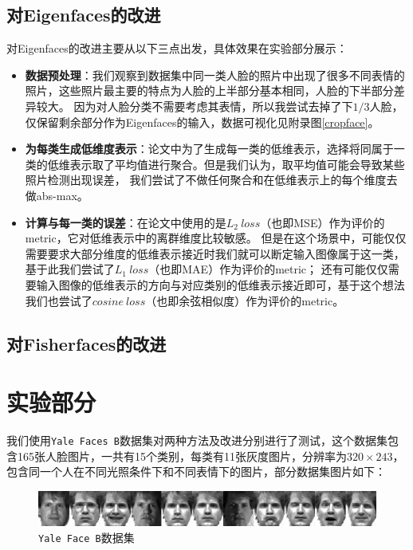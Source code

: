 \documentclass{ctexart}
\begin{document}
    \subsection{对Eigenfaces的改进}
    \noindent
    对Eigenfaces的改进主要从以下三点出发，具体效果在实验部分展示：
    \begin{itemize}
        \item \textbf{数据预处理}：我们观察到数据集中同一类人脸的照片中出现了很多不同表情的照片，这些照片最主要的特点为人脸的上半部分基本相同，人脸的下半部分差异较大。
                因为对人脸分类不需要考虑其表情，所以我尝试去掉了下$1/3$人脸，仅保留剩余部分作为Eigenfaces的输入，数据可视化见附录图\ref{cropface}。
        \item \textbf{为每类生成低维度表示}：论文中为了生成每一类的低维表示，选择将同属于一类的低维表示取了平均值进行聚合。但是我们认为，取平均值可能会导致某些照片检测出现误差，
                我们尝试了不做任何聚合和在低维表示上的每个维度去做abs-max。
        \item \textbf{计算与每一类的误差}：在论文中使用的是$L_2\ loss$（也即MSE）作为评价的metric，它对低维表示中的离群维度比较敏感。
                但是在这个场景中，可能仅仅需要要求大部分维度的低维表示接近时我们就可以断定输入图像属于这一类，基于此我们尝试了$L_1\ loss$（也即MAE）作为评价的metric；
                还有可能仅仅需要输入图像的低维表示的方向与对应类别的低维表示接近即可，基于这个想法我们也尝试了$cosine\ loss$（也即余弦相似度）作为评价的metric。
    \end{itemize}

    \subsection{对Fisherfaces的改进}


    \section{实验部分}
    我们使用\texttt{Yale Faces B}\cite{GeBeKr01}数据集对两种方法及改进分别进行了测试，这个数据集包含165张人脸图片，一共有15个类别，每类有11张灰度图片，分辨率为$320\times 243$，包含同一个人在不同光照条件下和不同表情下的图片，部分数据集图片如下：
    \begin{figure}[htbp]
        \centering
        \includegraphics[scale=0.7]{imgs/yale-face-B.png}
        \caption{\texttt{Yale Face B}数据集}
    \end{figure}
\end{document}
